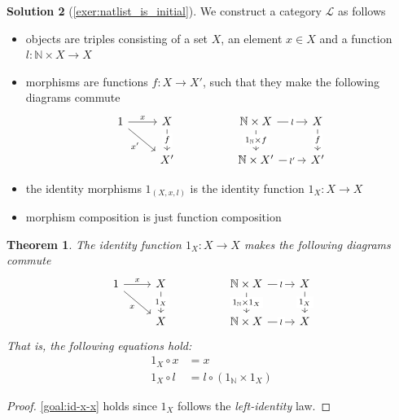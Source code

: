 \documentclass[a4paper,11pt, oneside,titlepage=false]{scrbook}
\theoremstyle{plain}
\newtheorem{thm}{Theorem}
\theoremstyle{definition}
\newtheorem{solution}[thm]{Solution}
\newcommand{\Cat}[1]{\mathcal{#1}}
\newcommand{\NN}{\ensuremath{\mathbb{N}}}
\begin{document}
\begin{solution}[\cref{exer:natlist_is_initial}]\label{sol:natlist_is_initial}
		We construct a category $\Cat{L}$ as follows
		\begin{itemize}
			\item objects are triples consisting of a set $X$, an element $x \in X$ and a function $l : \NN \times X \to X$
			\item morphisms are functions $f: X \to X'$, such that they make the following diagrams commute
      \[
        \begin{tikzcd}
          1 & X && {\NN \times X} & X \\
          & {X'} && {\NN \times X'} & {X'}
          \arrow["x", from=1-1, to=1-2]
          \arrow["{x'}"', from=1-1, to=2-2]
          \arrow["f"{description}, from=1-2, to=2-2]
          \arrow["l"{description}, from=1-4, to=1-5]
          \arrow["{l'}"{description}, from=2-4, to=2-5]
          \arrow["f"{description}, from=1-5, to=2-5]
          \arrow["{1_\NN \times f}"{description}, from=1-4, to=2-4]
        \end{tikzcd}
      \]
			\item the identity morphisms $1_{(X, x, l)}$ is the identity function $1_X : X \to X$
			\item morphism composition is just function composition
		\end{itemize}
		\begin{thm}
			The identity function $1_X : X \to X$ makes the following diagrams commute
			\[
				\begin{tikzcd}
					1 & X && {\NN \times X} & X \\
					& X && {\NN \times X} & X
					\arrow["x", from=1-1, to=1-2]
					\arrow["{x}"', from=1-1, to=2-2]
					\arrow["{1_X}"{description}, from=1-2, to=2-2]
					\arrow["l"{description}, from=1-4, to=1-5]
					\arrow["{l}"{description}, from=2-4, to=2-5]
					\arrow["{1_X}"{description}, from=1-5, to=2-5]
					\arrow["{1_\NN \times 1_X}"{description}, from=1-4, to=2-4]
				\end{tikzcd}
			\]
			That is, the following equations hold:
			\begin{align}
				\label{goal:id-x-x} 1_X \circ x & = x                                     \\
			  \label{goal:id-l-l-id} 1_X \circ l & = l \circ (1_\NN \times 1_X)
			\end{align}
		\end{thm}
		\begin{proof}
			\eqref{goal:id-x-x} holds since $1_X$ follows the \textit{left-identity} law.


\end{proof}
\end{solution}
\end{document}
